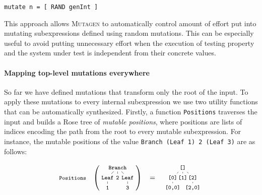 \documentclass[sigconf,review,anonymous]{acmart}
\newcommand{\mutagen}{\textsc{Mutagen}\xspace}
\begin{document}
\begin{verbatim}
mutate n = [ RAND genInt ]
\end{verbatim}

This approach allows \mutagen to automatically control amount of effort put into
mutating subexpressions defined using random mutations.
%
This can be especially useful to avoid putting unnecessary effort when the
execution of testing property and the system under test is independent from
their concrete values. 


\paragraph{Mapping top-level mutations everywhere}

So far we have defined mutations that transform only the root of the input.
%
To apply these mutations to every internal subexpression we use two utility
functions that can be automatically synthesized.
%
Firstly, a function \texttt{Positions} traverses the input and builds a Rose
tree\cite{} of \emph{mutable positions}, where positions are lists of indices
encoding the path from the root to every mutable subexpression.
%
%
%
%
For instance, the mutable positions of the value \texttt{Branch (Leaf 1) 2
  (Leaf 3)} are as follows:

\vspace{-5pt}
\begin{equation}
  \nonumber
  \footnotesize
  \texttt{Positions}\quad
  \left(
  \tikz[
    baseline=-6mm,
    level distance=0.5cm,
    level 1/.style={sibling distance=0.5cm},
    level 2/.style={sibling distance=0.5cm}
  ]{
    \node {\texttt{Branch}}
      child {node {\texttt{Leaf}}
        child {node {\texttt{1}}}
      }
      child {node {\texttt{2}}}
      child {node {\texttt{Leaf}}
        child {node {\texttt{3}}}
      };
  }
  \right)
  \quad
  =
  \quad
  \tikz[
    baseline=-6mm,
    level distance=0.5cm,
    level 1/.style={sibling distance=0.5cm},
    level 2/.style={sibling distance=0.5cm}
  ]{
    \node {\texttt{[]}}
      child {node {\texttt{[0]}}
        child {node {\texttt{[0,0]}}}
      }
      child {node {\texttt{[1]}}}
      child {node {\texttt{[2]}}
        child {node {\texttt{[2,0]}}}
      };
  }
\end{equation}
\end{document}
